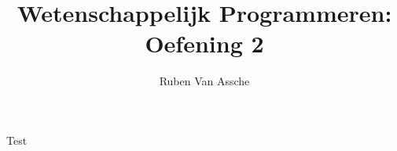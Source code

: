 \documentclass[10pt,a4paper]{article}
\author{Ruben Van Assche}
\title{Wetenschappelijk Programmeren: Oefening 2}
\begin{document}
\maketitle
Test
\end{document}
